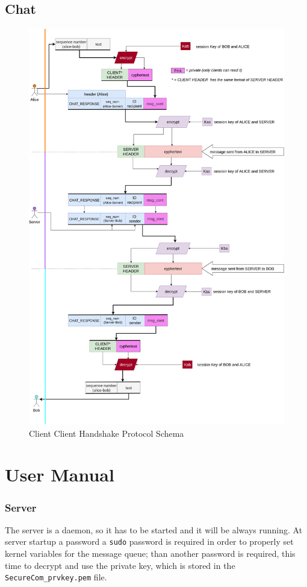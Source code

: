 \documentclass[11pt]{report}
\begin{document}
\section{Chat}
\begin{figure}[H]
	\centering
	\includegraphics[scale=0.15]{img/message_relay.png}
	\caption{Client Client Handshake Protocol Schema}
	\label {img: MessageRelay}
\end{figure}


\chapter{User Manual}
\subsection*{Server}
The server is a daemon, so it has to be started and it will be always running. At server startup a password
a \texttt{sudo} password is required in order to properly set kernel variables for the message queue; than another password
is required, this time to decrypt and use the private key, which is stored in the \verb|SecureCom_prvkey.pem| file.
\end{document}
